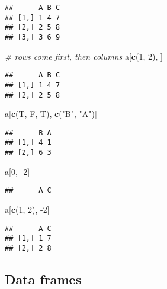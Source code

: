 \documentclass[
]{book}
\newenvironment{Shaded}{\begin{snugshade}}{\end{snugshade}}
\newcommand{\CommentTok}[1]{\textcolor[rgb]{0.56,0.35,0.01}{\textit{#1}}}
\newcommand{\DecValTok}[1]{\textcolor[rgb]{0.00,0.00,0.81}{#1}}
\newcommand{\KeywordTok}[1]{\textcolor[rgb]{0.13,0.29,0.53}{\textbf{#1}}}
\newcommand{\NormalTok}[1]{#1}
\newcommand{\StringTok}[1]{\textcolor[rgb]{0.31,0.60,0.02}{#1}}
\begin{document}
\begin{verbatim}
##      A B C
## [1,] 1 4 7
## [2,] 2 5 8
## [3,] 3 6 9
\end{verbatim}

\begin{Shaded}
\begin{Highlighting}[]
\CommentTok{\# rows come first, then columns}
\NormalTok{a[}\KeywordTok{c}\NormalTok{(}\DecValTok{1}\NormalTok{, }\DecValTok{2}\NormalTok{), ]}
\end{Highlighting}
\end{Shaded}

\begin{verbatim}
##      A B C
## [1,] 1 4 7
## [2,] 2 5 8
\end{verbatim}

\begin{Shaded}
\begin{Highlighting}[]
\NormalTok{a[}\KeywordTok{c}\NormalTok{(T, F, T), }\KeywordTok{c}\NormalTok{(}\StringTok{"B"}\NormalTok{, }\StringTok{"A"}\NormalTok{)]}
\end{Highlighting}
\end{Shaded}

\begin{verbatim}
##      B A
## [1,] 4 1
## [2,] 6 3
\end{verbatim}

\begin{Shaded}
\begin{Highlighting}[]
\NormalTok{a[}\DecValTok{0}\NormalTok{, }\DecValTok{{-}2}\NormalTok{]}
\end{Highlighting}
\end{Shaded}

\begin{verbatim}
##      A C
\end{verbatim}

\begin{Shaded}
\begin{Highlighting}[]
\NormalTok{a[}\KeywordTok{c}\NormalTok{(}\DecValTok{1}\NormalTok{, }\DecValTok{2}\NormalTok{), }\DecValTok{{-}2}\NormalTok{]}
\end{Highlighting}
\end{Shaded}

\begin{verbatim}
##      A C
## [1,] 1 7
## [2,] 2 8
\end{verbatim}

\hypertarget{data-frames}{%
\subsection{Data frames}\label{data-frames}}
\end{document}
